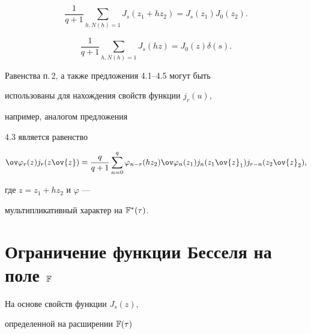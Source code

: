 \begin{props}


$$


\frac{1}{q+1}\sum_{h, N(h)=1}{J_s(z_1+hz_2)}=J_s(z_1)J_0(z_2).


$$


\end{props}





\begin{cors}


$$


\frac{1}{q+1}\sum_{h, N(h)=1}{J_s(hz)}=J_0(z)\delta(s).


$$


\end{cors}





\begin{notenonum}


Равенства п.\,2, а также предложения 4.1--4.5 могут быть 


использованы для нахождения свойств функции $j_r(u)$,


например, аналогом предложения


4.3 является равенство


$$


\ov\varphi_r(z)j_r(z\ov{z})=\frac{q}{q+1}\sum_{n=0}^q{\varphi_{n-r}(hz_2)}


{\ov\varphi_n(z_1)


j_n(z_1\ov{z}_1) j_{r-n}(z_2\ov{z}_2)},


$$


где $z=z_1+hz_2$ и $\varphi$ ---


мультипликативный характер на $\Bbb F^*(\tau)$.


\end{notenonum}





\section{Ограничение функции Бесселя на поле $\Bbb F$}





На основе свойств функции $J_s(z)$, 


определенной на расширении $\Bbb F(\tau)$


